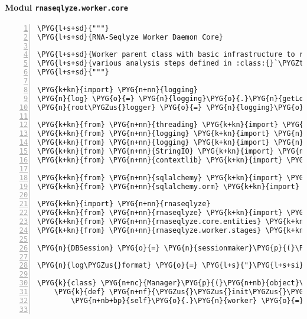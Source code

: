 \paragraph{Modul \texttt{rnaseqlyze.worker.core}}
\label{rnaseqlyze-pdf:modul-rnaseqlyze-worker-core}
\begin{Verbatim}[commandchars=\\\{\},numbers=left,firstnumber=1,stepnumber=5]
\PYG{l+s+sd}{"""}
\PYG{l+s+sd}{RNA-Seqlyze Worker Daemon Core}

\PYG{l+s+sd}{Worker parent class with basic infrastructure to run the}
\PYG{l+s+sd}{various analysis steps defined in :class:{}`\PYGZti{}.WorkerStages{}`.}
\PYG{l+s+sd}{"""}

\PYG{k+kn}{import} \PYG{n+nn}{logging}
\PYG{n}{log} \PYG{o}{=} \PYG{n}{logging}\PYG{o}{.}\PYG{n}{getLogger}\PYG{p}{(}\PYG{n}{\PYGZus{}\PYGZus{}name\PYGZus{}\PYGZus{}}\PYG{p}{)}
\PYG{n}{root\PYGZus{}logger} \PYG{o}{=} \PYG{n}{logging}\PYG{o}{.}\PYG{n}{getLogger}\PYG{p}{(}\PYG{p}{)}

\PYG{k+kn}{from} \PYG{n+nn}{threading} \PYG{k+kn}{import} \PYG{n}{Thread}
\PYG{k+kn}{from} \PYG{n+nn}{logging} \PYG{k+kn}{import} \PYG{n}{Formatter}
\PYG{k+kn}{from} \PYG{n+nn}{logging} \PYG{k+kn}{import} \PYG{n}{StreamHandler}
\PYG{k+kn}{from} \PYG{n+nn}{StringIO} \PYG{k+kn}{import} \PYG{n}{StringIO}
\PYG{k+kn}{from} \PYG{n+nn}{contextlib} \PYG{k+kn}{import} \PYG{n}{contextmanager}

\PYG{k+kn}{from} \PYG{n+nn}{sqlalchemy} \PYG{k+kn}{import} \PYG{n}{create\PYGZus{}engine}
\PYG{k+kn}{from} \PYG{n+nn}{sqlalchemy.orm} \PYG{k+kn}{import} \PYG{n}{sessionmaker}

\PYG{k+kn}{import} \PYG{n+nn}{rnaseqlyze}
\PYG{k+kn}{from} \PYG{n+nn}{rnaseqlyze} \PYG{k+kn}{import} \PYG{n}{efetch}
\PYG{k+kn}{from} \PYG{n+nn}{rnaseqlyze.core.entities} \PYG{k+kn}{import} \PYG{n}{Analysis}\PYG{p}{,} \PYG{n}{StageLog}
\PYG{k+kn}{from} \PYG{n+nn}{rnaseqlyze.worker.stages} \PYG{k+kn}{import} \PYG{n}{WorkerStages}

\PYG{n}{DBSession} \PYG{o}{=} \PYG{n}{sessionmaker}\PYG{p}{(}\PYG{p}{)}

\PYG{n}{log\PYGZus{}format} \PYG{o}{=} \PYG{l+s}{"}\PYG{l+s+si}{\PYGZpc{}(levelname)-5.5s}\PYG{l+s}{ [}\PYG{l+s+si}{\PYGZpc{}(name)s}\PYG{l+s}{] }\PYG{l+s+si}{\PYGZpc{}(message)s}\PYG{l+s}{"}

\PYG{k}{class} \PYG{n+nc}{Manager}\PYG{p}{(}\PYG{n+nb}{object}\PYG{p}{)}\PYG{p}{:}
    \PYG{k}{def} \PYG{n+nf}{\PYGZus{}\PYGZus{}init\PYGZus{}\PYGZus{}}\PYG{p}{(}\PYG{n+nb+bp}{self}\PYG{p}{)}\PYG{p}{:}
        \PYG{n+nb+bp}{self}\PYG{o}{.}\PYG{n}{worker} \PYG{o}{=} \PYG{n}{Thread}\PYG{p}{(}\PYG{p}{)}


\end{Verbatim}
